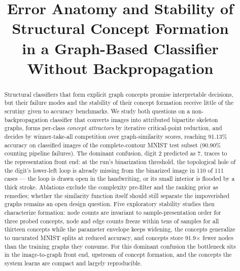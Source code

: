 \documentclass[conference]{IEEEtran}
\begin{document}
\title{Error Anatomy and Stability of Structural Concept Formation\\
in a Graph-Based Classifier Without Backpropagation}

\author{
}

\maketitle

\begin{abstract}
Structural classifiers that form explicit graph concepts promise
interpretable decisions, but their failure modes and the stability of
their concept formation receive little of the scrutiny given to accuracy
benchmarks. We study both questions on a non-backpropagation classifier
that converts images into attributed bipartite skeleton graphs, forms
per-class \emph{concept attractors} by iterative critical-point reduction,
and decides by winner-take-all competition over graph-similarity scores,
reaching 91.13\% accuracy on classified images of the complete-contour
MNIST test subset (90.90\% counting pipeline failures). The dominant
confusion, digit 2 predicted as 7, traces to the representation front end:
at the run's binarization threshold, the topological hole of the digit's
lower-left loop is already missing from the binarized image in 110 of 111
cases --- the loop is drawn open in the handwriting, or its small interior
is flooded by a thick stroke. Ablations exclude the complexity pre-filter
and the ranking prior as remedies; whether the similarity function itself
should still separate the impoverished graphs remains an open design
question. Five exploratory stability studies then characterize formation:
node counts are invariant to sample-presentation order for three probed
concepts, node and edge counts freeze within tens of samples for all thirteen
concepts while the parameter envelope keeps widening, the concepts
generalize to uncurated MNIST
splits at reduced accuracy, and concepts store 91.9$\times$ fewer nodes
than the training graphs they consume. For this dominant confusion the
bottleneck sits in the image-to-graph front end, upstream of concept
formation, and the concepts the system learns are compact and largely
reproducible.
\end{abstract}
\end{document}
